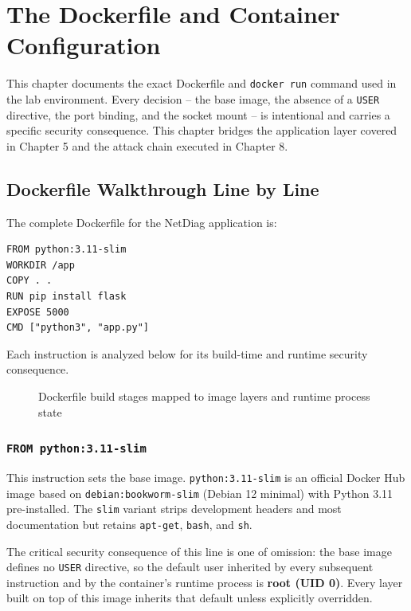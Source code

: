 \chapter{The Dockerfile and Container Configuration}

This chapter documents the exact Dockerfile and \texttt{docker run} command used in the lab environment. Every decision -- the base image, the absence of a \texttt{USER} directive, the port binding, and the socket mount -- is intentional and carries a specific security consequence. This chapter bridges the application layer covered in Chapter 5 and the attack chain executed in Chapter 8.

\section{Dockerfile Walkthrough Line by Line}

The complete Dockerfile for the NetDiag application is:

\begin{lstlisting}[language=docker]
FROM python:3.11-slim
WORKDIR /app
COPY . .
RUN pip install flask
EXPOSE 5000
CMD ["python3", "app.py"]
\end{lstlisting}

Each instruction is analyzed below for its build-time and runtime security consequence.

\begin{figure}[h]
\centering
\vspace{3.5cm}
\caption{Dockerfile build stages mapped to image layers and runtime process state}
\end{figure}

\subsection*{\texttt{FROM python:3.11-slim}}

This instruction sets the base image. \texttt{python:3.11-slim} is an official Docker Hub image based on \texttt{debian:bookworm-slim} (Debian 12 minimal) with Python 3.11 pre-installed. The \texttt{slim} variant strips development headers and most documentation but retains \texttt{apt-get}, \texttt{bash}, and \texttt{sh}.

The critical security consequence of this line is one of omission: the base image defines no \texttt{USER} directive, so the default user inherited by every subsequent instruction and by the container's runtime process is \textbf{root (UID 0)}. Every layer built on top of this image inherits that default unless explicitly overridden.

